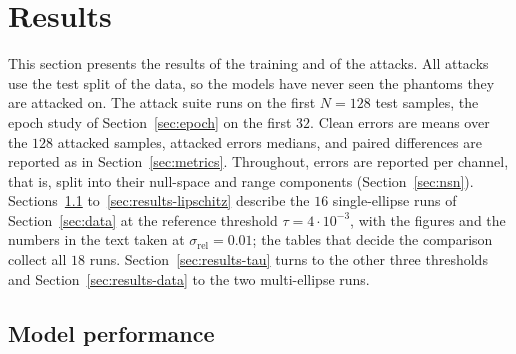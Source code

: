 \documentclass{article}
\numberwithin{equation}{section}
\begin{document}
\section{Results}\label{sec:results}
This section presents the results of the training and of the attacks.
All attacks use the test split of the data, so the models have never seen the phantoms they are attacked on.
The attack suite runs on the first $N=128$ test samples, the epoch study of Section~\ref{sec:epoch} on the first $32$.
Clean errors are means over the $128$ attacked samples, attacked errors medians, and paired differences
are reported as in Section~\ref{sec:metrics}. Throughout, errors are reported per channel, that is, split
into their null-space and range components (Section~\ref{sec:nsn}).\\
Sections~\ref{sec:results-perf} to~\ref{sec:results-lipschitz} describe the $16$ single-ellipse runs of
Section~\ref{sec:data} at the reference threshold $\tau=4\cdot10^{-3}$, with the figures and the numbers in
the text taken at $\sigma_\text{rel}=0.01$; the tables that decide the comparison collect all $18$ runs.
Section~\ref{sec:results-tau} turns to the other three thresholds and Section~\ref{sec:results-data} to the
two multi-ellipse runs.
\subsection{Model performance}\label{sec:results-perf}
\end{document}
